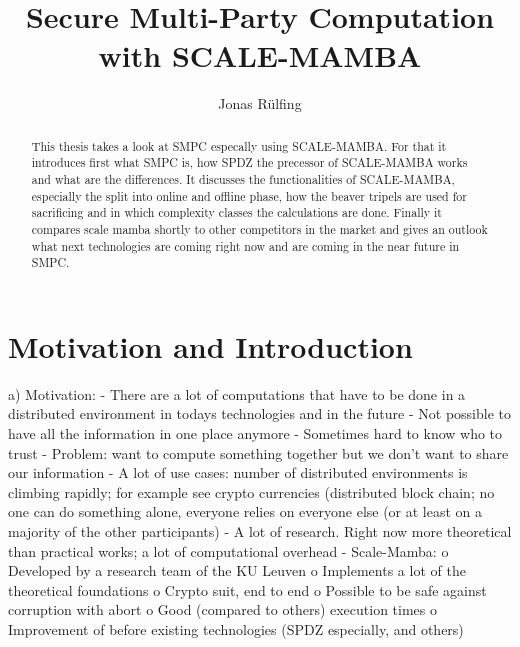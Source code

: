 \documentclass[english,runningheads,a4paper]{llncs}[2018/03/10]
\begin{document}
\title{Secure Multi-Party Computation with SCALE-MAMBA}

\author{Jonas Rülfing}

%
%

\maketitle

\begin{abstract}
  This thesis takes a look at SMPC especally using SCALE-MAMBA. For that it introduces first what SMPC is,  how SPDZ the precessor of SCALE-MAMBA works and what are the differences. It discusses the functionalities of SCALE-MAMBA, especially the split into online and offline phase, how the beaver tripels are used for sacrificing and in which complexity classes the calculations are done. Finally it compares scale mamba shortly to other competitors in the market and gives an outlook what next technologies are coming right now and are coming in the near future in SMPC.
\end{abstract}

\section{Motivation and Introduction}\label{sec:intromoti}
a)	Motivation: 
-	There are a lot of computations that have to be done in a distributed environment in todays technologies and in the future
-	Not possible to have all the information in one place anymore
-	Sometimes hard to know who to trust 
-	Problem: want to compute something together but we don’t want to share our information
-	A lot of use cases: number of distributed environments is climbing rapidly; for example see crypto currencies (distributed block chain; no one can do something alone, everyone relies on everyone else (or at least on a majority of the other participants)
-	A lot of research. Right now more theoretical than practical works; a lot of computational overhead
-	Scale-Mamba: 
o	Developed by a research team of the KU Leuven
o	Implements a lot of the theoretical foundations
o	Crypto suit, end to end
o	Possible to be safe against corruption with abort
o	Good (compared to others) execution times
o	Improvement of before existing technologies (SPDZ especially, and others)
\end{document}
